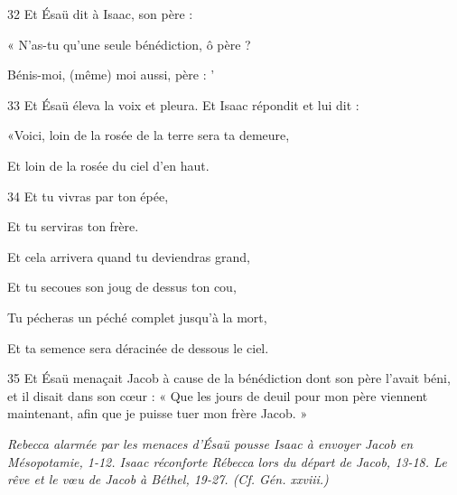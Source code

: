 \par    
\par 32 Et Ésaü dit à Isaac, son père :  
\par     « N'as-tu qu'une seule bénédiction, ô père ?  
\par     Bénis-moi, (même) moi aussi, père : '
\par    
\par 33 Et Ésaü éleva la voix et pleura. Et Isaac répondit et lui dit :
\par    
\par     «Voici, loin de la rosée de la terre sera ta demeure,  
\par     Et loin de la rosée du ciel d'en haut.
\par    
\par 34 Et tu vivras par ton épée,  
\par     Et tu serviras ton frère.
\par    
\par     Et cela arrivera quand tu deviendras grand,  
\par     Et tu secoues son joug de dessus ton cou,  
\par     Tu pécheras un péché complet jusqu'à la mort,  
\par     Et ta semence sera déracinée de dessous le ciel.
\par    
\par 35 Et Ésaü menaçait Jacob à cause de la bénédiction dont son père l'avait béni, et il disait dans son cœur : « Que les jours de deuil pour mon père viennent maintenant, afin que je puisse tuer mon frère Jacob. »


\par \textit{Rebecca alarmée par les menaces d'Ésaü pousse Isaac à envoyer Jacob en Mésopotamie, 1-12. Isaac réconforte Rébecca lors du départ de Jacob, 13-18. Le rêve et le vœu de Jacob à Béthel, 19-27. (Cf. Gén. xxviii.)}

